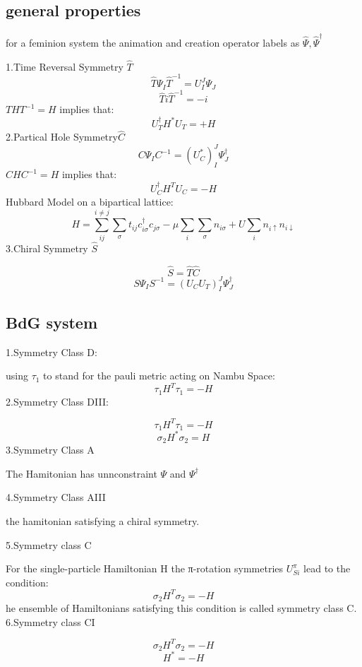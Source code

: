 \subsection{general properties}
for a feminion system the animation and creation operator labels as $\hat{\Psi},\hat{\Psi}^{\dagger}$\par
\noindent 1.Time Reversal Symmetry $\hat{T}$
\[\hat{T}\Psi_I\hat{T}^{-1}=U_I^J\Psi_J\]
\[ \hat{T}i\hat{T}^{-1}=-i\]
$THT^{-1}=H$ implies that:
\[U_T^{\dagger}H^*U_T=+H\]
\noindent 2.Partical Hole Symmetry$\hat{C}$
\[C\Psi_IC^{-1}=(U_C^*)_I^J\Psi_J^{\dagger}\]
$CHC^{-1}=H$ implies that:
\[U_C^{\dagger}H^TU_C=-H\]
Hubbard Model on a bipartical lattice:
\[H=\sum_{ij}^{i\neq j}\sum_{\sigma}t_{ij}c_{i\sigma}^{\dagger}c_{j\sigma}-\mu\sum_i\sum_{\sigma}n_{i\sigma}+U\sum_i n_{i \uparrow}n_{i\downarrow}\] 
\noindent 3.Chiral Symmetry $\hat{S}$\par
\[\hat{S}=\hat{T}\hat{C}\]
\[S\Psi_IS^{-1}=(U_CU_T)_I^J\Psi_J^{\dagger}\]

\subsection{BdG system}
\noindent 1.Symmetry Class D:\par
using $\tau_1$ to stand for the pauli metric acting on Nambu Space:
\[\tau_1H^T\tau_1=-H\]
\noindent 2.Symmetry Class DIII:\par
\[\tau_1H^T\tau_1=-H\]
\[\sigma_2 H^*\sigma_2=H\]
\noindent 3.Symmetry Class A\par
The Hamitonian has unnconstraint $\Psi$ and $\Psi^\dagger$\par
\noindent 4.Symmetry Class AIII\par
the hamitonian satisfying a chiral symmetry.\par
\noindent 5.Symmetry class C\par
For the single-particle Hamiltonian H the π-rotation symmetries $U_{Si}^{\pi}$ lead to the condition:
\[\sigma_2H^T\sigma_2=-H\]
he ensemble of Hamiltonians satisfying this condition is
called symmetry class C.
\noindent 6.Symmetry class CI\par
\[\sigma_2H^T\sigma_2=-H\]
\[H^*=-H\]
